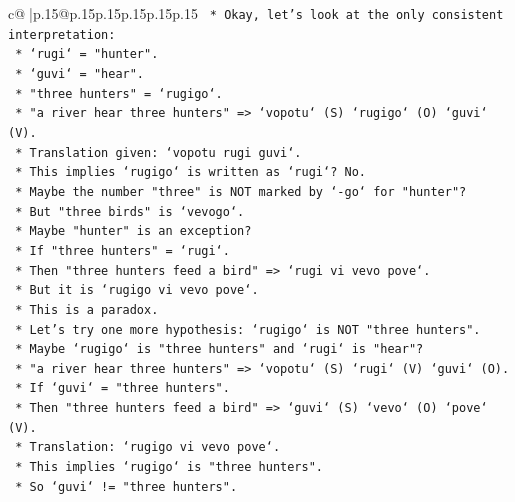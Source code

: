 \documentclass{article}
\begin{document}
{\begin{supertabular}{c@{$\;$}|p{.15\linewidth}@{}p{.15\linewidth}p{.15\linewidth}p{.15\linewidth}p{.15\linewidth}p{.15\linewidth}}
{{{\texttt{                        *   Okay, let's look at the only consistent interpretation:} \\
\texttt{                        *   `rugi` = "hunter".} \\
\texttt{                        *   `guvi` = "hear".} \\
\texttt{                        *   "three hunters" = `rugigo`.} \\
\texttt{                        *   "a river hear three hunters" => `vopotu` (S) `rugigo` (O) `guvi` (V).} \\
\texttt{                        *   Translation given: `vopotu rugi guvi`.} \\
\texttt{                        *   This implies `rugigo` is written as `rugi`? No.} \\
\texttt{                        *   Maybe the number "three" is NOT marked by `{-}go` for "hunter"?} \\
\texttt{                        *   But "three birds" is `vevogo`.} \\
\texttt{                        *   Maybe "hunter" is an exception?} \\
\texttt{                        *   If "three hunters" = `rugi`.} \\
\texttt{                        *   Then "three hunters feed a bird" => `rugi vi vevo pove`.} \\
\texttt{                        *   But it is `rugigo vi vevo pove`.} \\
\texttt{                        *   This is a paradox.} \\
\texttt{                        *   Let's try one more hypothesis: `rugigo` is NOT "three hunters".} \\
\texttt{                        *   Maybe `rugigo` is "three hunters" and `rugi` is "hear"?} \\
\texttt{                        *   "a river hear three hunters" => `vopotu` (S) `rugi` (V) `guvi` (O).} \\
\texttt{                        *   If `guvi` = "three hunters".} \\
\texttt{                        *   Then "three hunters feed a bird" => `guvi` (S) `vevo` (O) `pove` (V).} \\
\texttt{                        *   Translation: `rugigo vi vevo pove`.} \\
\texttt{                        *   This implies `rugigo` is "three hunters".} \\
\texttt{                        *   So `guvi` != "three hunters".} \\
}}}
\end{supertabular}}
\end{document}
